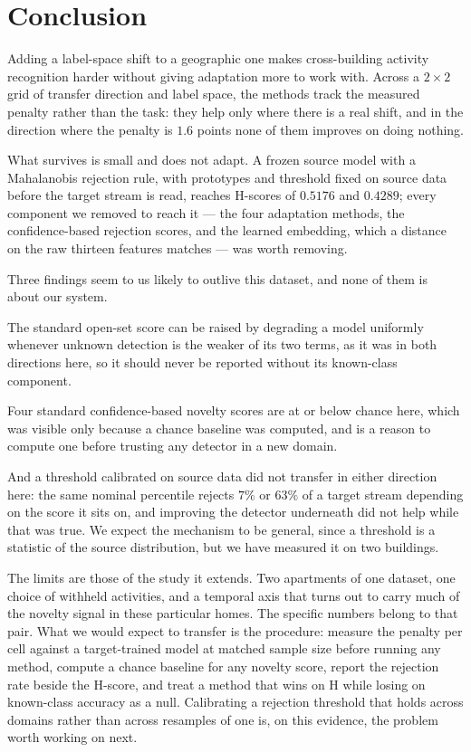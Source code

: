 \section{Conclusion}
\label{sec:os-conclusion}

Adding a label-space shift to a geographic one makes cross-building activity recognition
harder without giving adaptation more to work with. Across a $2\times2$ grid of transfer
direction and label space, the methods track the measured penalty rather than the task:
they help only where there is a real shift, and in the direction where the penalty is
$1.6$ points none of them improves on doing nothing.

What survives is small and does not adapt. A frozen source model with a Mahalanobis
rejection rule, with prototypes and threshold fixed on source data before the target
stream is read, reaches H-scores of $0.5176$ and $0.4289$; every component we removed to
reach it --- the four adaptation methods, the confidence-based rejection scores, and the
learned embedding, which a distance on the raw thirteen features matches --- was worth
removing.

Three findings seem to us likely to outlive this dataset, and none of them is about
our system.

The standard open-set score can be raised by degrading a model uniformly whenever
unknown detection is the weaker of its two terms, as it was in both directions here, so
it should never be reported without its known-class component.

Four standard confidence-based novelty scores are at or below chance here, which was
visible only because a chance baseline was computed, and is a reason to compute one
before trusting any detector in a new domain.

And a threshold calibrated on source data did not transfer in either direction here: the
same nominal percentile rejects $7\%$ or $63\%$ of a target stream depending on the
score it sits on, and improving the detector underneath did not help while that was
true. We expect the mechanism to be general, since a threshold is a statistic of the
source distribution, but we have measured it on two buildings.

The limits are those of the study it extends. Two apartments of one dataset, one choice of
withheld activities, and a temporal axis that turns out to carry much of the novelty
signal in these particular homes. The specific numbers belong to that pair. What we would
expect to transfer is the procedure: measure the penalty per cell against a target-trained
model at matched sample size before running any method, compute a chance baseline for any
novelty score, report the rejection rate beside the H-score, and treat a method that wins
on H while losing on known-class accuracy as a null. Calibrating a rejection threshold
that holds across domains rather than across resamples of one is, on this evidence, the
problem worth working on next.
